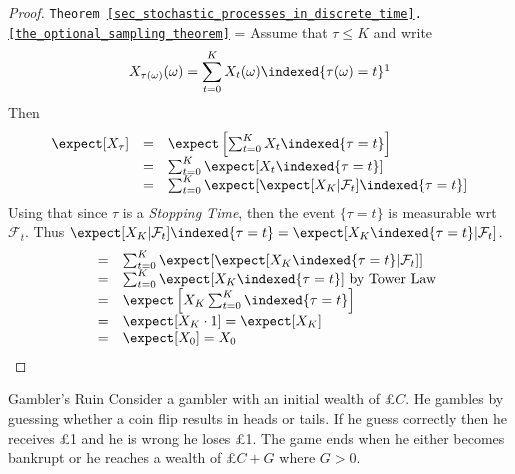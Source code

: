 \documentclass[11pt,a4paper]{article}
\begin{document}
    \begin{proof}{\texttt{Theorem \ref{sec_stochastic_processes_in_discrete_time}.\ref{the_optional_sampling_theorem}}}
      \everymath={\displaystyle}
      Assume that $\tau\leq K$ and write
      \[ X_{\tau(\omega)}(\omega)=\sum_{t=0}^KX_t(\omega)\indexed\{\tau(\omega)=t\}\footnotemark \]
      Then
      \[\begin{array}{rcl}
        \expect[X_\tau]&=&\expect\left[\sum_{t=0}^KX_t\indexed\{\tau=t\}\right]\\
        &=&\sum_{t=0}^K\expect[X_t\indexed\{\tau=t\}]\\
        &=&\sum_{t=0}^K\expect[\expect[X_K|\mathcal{F}_t]\indexed\{\tau=t\}]
      \end{array}\]
      Using that since $\tau$ is a \textit{Stopping Time}, then the event $\{\tau=t\}$ is measurable wrt $\mathcal{F}_t$. Thus $\expect[X_K|\mathcal{F}_t]\indexed\{\tau=t\}=\expect[X_K\indexed\{\tau=t\}|\mathcal{F}_t]$.
      \[\begin{array}{rcl}
        &=&\sum_{t=0}^K\expect[\expect[X_K\indexed\{\tau=t\}|\mathcal{F}_t]]\\
        &=&\sum_{t=0}^K\expect[X_K\indexed\{\tau=t\}]\text{ by Tower Law}\\
        &=&\expect\left[X_K\sum_{t=0}^K\indexed\{\tau=t\}\right]\\
        &=&\expect[X_K\cdot1]=\expect[X_K]\\
        &=&\expect[X_0]=X_0
      \end{array}\]
    \end{proof}

    \begin{example}{Gambler's Ruin}\label{example_gamblers_ruin}
      Consider a gambler with an initial wealth of £$C$. He gambles by guessing whether a coin flip results in heads or tails. If he guess correctly then he receives £1 and he is wrong he loses £1. The game ends when he either becomes bankrupt or he reaches a wealth of £$C+G$ where $G>0$.
    \end{example}
\end{document}
